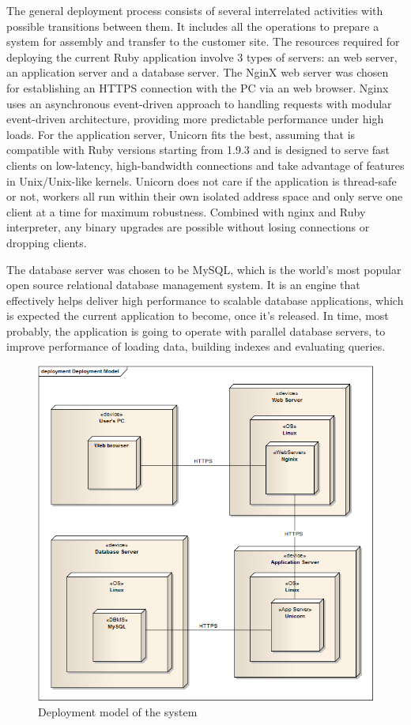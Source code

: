 The general deployment process consists of several interrelated activities with possible transitions between them.  It includes all the operations to prepare a system for assembly and transfer to the customer site. The resources required for deploying the current Ruby application involve 3 types of servers: an web server, an application server and a database server. The NginX web server was chosen for establishing an HTTPS connection with the PC via an web browser. Nginx uses an asynchronous event-driven approach to handling requests with modular event-driven architecture, providing more predictable performance under high loads. For the application server, Unicorn fits the best, assuming that is compatible with Ruby versions starting from 1.9.3 and is designed to serve fast clients on low-latency, high-bandwidth connections and take advantage of features in Unix/Unix-like kernels. Unicorn does not care if the application is thread-safe or not, workers all run within their own isolated address space and only serve one client at a time for maximum robustness. Combined with nginx and Ruby interpreter, any  binary upgrades are possible  without losing connections or dropping clients.

 The database server was chosen to be MySQL, which is the world's most popular open source relational database management system. It is an engine that effectively helps deliver high performance to scalable database applications, which is expected the current application to become, once it's released. In time, most probably, the application is going to operate with parallel database servers, to improve performance of  loading data, building indexes and evaluating queries.

\begin{figure}[H]
\centering
\includegraphics[width=14cm]{Chapter2/Deployment_Model.png}
\caption{Deployment model of the system}
\label{fig:Deployment_Model}
\end{figure}